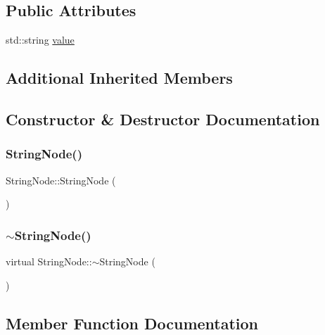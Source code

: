 \subsection*{Public Attributes}
\begin{DoxyCompactItemize}
\item 
std\+::string \hyperlink{classStringNode_a52fd9cb80da963e39d0d6d33d5396c93}{value}
\end{DoxyCompactItemize}
\subsection*{Additional Inherited Members}


\subsection{Constructor \& Destructor Documentation}
\mbox{\label{classStringNode_a3ac1767041e5519e52ada6e7c5ecbbe4}} 
\subsubsection{\texorpdfstring{String\+Node()}{StringNode()}}
{\footnotesize\ttfamily String\+Node\+::\+String\+Node (\begin{DoxyParamCaption}{ }\end{DoxyParamCaption})}

\mbox{\label{classStringNode_a2b2f8f89db3402822e55da8ede0ca443}} 
\subsubsection{\texorpdfstring{$\sim$\+String\+Node()}{~StringNode()}}
{\footnotesize\ttfamily virtual String\+Node\+::$\sim$\+String\+Node (\begin{DoxyParamCaption}{ }\end{DoxyParamCaption})\hspace{0.3cm}{\ttfamily [virtual]}}



\subsection{Member Function Documentation}
\mbox{\label{classStringNode_a1399a24e093f4ecd00957268923c5d23}} 
